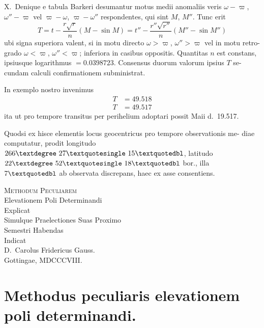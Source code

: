 \documentclass[12pt,a4paper]{article}
\begin{document}
X.\ Denique e tabula Barkeri desumantur motus medii anomaliis veris
$\omega - \varpi$, $\omega'' - \varpi$ vel $\varpi - \omega$, $\varpi - \omega''$ respondentes, qui sint $M$, $M''$. Tunc erit
\[
T = t - \frac{r\sqrt{r}}{n}(M - \sin M) = t'' - \frac{r''\sqrt{r''}}{n}(M'' - \sin M'')
\]
ubi signa superiora valent, si in motu directo $\omega > \varpi$, $\omega'' > \varpi$ vel in motu retro-
grado $\omega < \varpi$, $\omega'' < \varpi$; inferiora in casibus oppositis. Quantitas $n$ est constans,
ipsiusque logarithmus $= 0.0398723$. Consensus duorum valorum ipsius $T$ se-
cundam calculi confirmationem subministrat.

In exemplo nostro invenimus
\begin{align*}
T &= 49.518 \\
T &= 49.517
\end{align*}
ita ut pro tempore transitus per perihelium adoptari possit Maii d.\ 19.517.

Quodsi ex hisce elementis locus geocentricus pro tempore observationis me-
diae computatur, prodit longitudo $266\textdegree\ 27\textquotesingle\ 15\textquotedbl$, latitudo $22\textdegree\ 52\textquotesingle\ 18\textquotedbl$ bor., illa
$7\textquotedbl$ ab observata discrepans, haec ex asse consentiens.



\newpage
\thispagestyle{empty}
\begin{center}
\vspace*{2cm}

{\Large\scshape Methodum Peculiarem}\\[0.5em]
{\large Elevationem Poli Determinandi}\\[1em]
{\large Explicat}\\[0.5em]
{\large Simulque Praelectiones Suas Proximo}\\[0.5em]
{\large Semestri Habendas}\\[0.5em]
{\large Indicat}\\[1.5em]

{\Large D.\ Carolus Fridericus Gauss.}\\[2em]

{\large Gottingae, MDCCCVIII.}
\end{center}

\newpage

\section*{Methodus peculiaris elevationem poli determinandi.}
\end{document}
